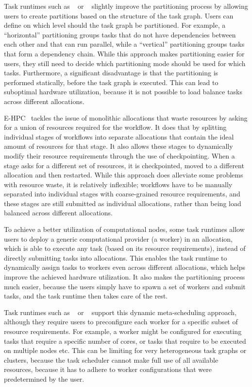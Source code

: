 Task runtimes such as \pegasus{}~\cite{pegasus} or \autosubmit~\cite{autosubmit} slightly improve
the partitioning process by allowing users to create partitions based on the structure of the
task graph. Users can define on which level should the task graph be partitioned. For example,
a ``horizontal'' partitioning groups tasks that do not have dependencies between each other and that
can run parallel, while a ``vertical'' partitioning groups tasks that form a dependency chain.
While this approach makes partitioning easier for users, they still need to decide which
partitioning mode should be used for which tasks. Furthermore, a significant disadvantage is
that the partitioning is performed statically, before the task graph is executed. This can lead
to suboptimal hardware utilization, because it is not possible to load balance tasks across
different allocations.

\textsc{E-HPC}~\cite{ehpc} tackles the issue of monolithic allocations that waste resources by
asking for a union of resources required for the workflow. It does that by splitting individual
stages of workflows into separate allocations that contain the ideal amount of resources for that
stage. It also allows these stages to dynamically modify their resource requirements through the
use of checkpointing. When a stage asks for a different set of resources, it is checkpointed, moved
to a different allocation and then restarted. While this approach does alleviate some problems with
resource waste, it is relatively inflexible; workflows have to be manually separated into
individual stages with coarse-grained resource requirements, and these stages are still submitted
as individual allocations, rather than being load balanced across different allocations.

To achieve a better utilization of computational nodes, some task runtimes allow users to
deploy a generic computational provider (a worker) in an allocation, which is able to execute
any task (based on its resource requirements), instead of directly submitting tasks into
allocations. This enables the task runtime to dynamically assign tasks to workers even across
different allocations, which helps improve the achieved hardware utilization.
It also makes the partitioning process much easier, because the users simply have to spawn a set
of workers and submit tasks, and the task runtime then takes care of the rest.

Task runtimes such as \merlin{}~\cite{merlin} or \parsl{}~\cite{parsl} support this dynamic
meta-scheduling approach, although they require users to preconfigure each worker for a specific
subset of resource requirements. For example, a worker might be configured for executing tasks
that require a specific number of cores, or tasks that require to be executed on multiple nodes
etc. This can be limiting for very heterogeneous task graphs or clusters, because the task scheduler
cannot make full use of all available resources, because it has to adhere to worker configurations
that were predetermined by the user.

